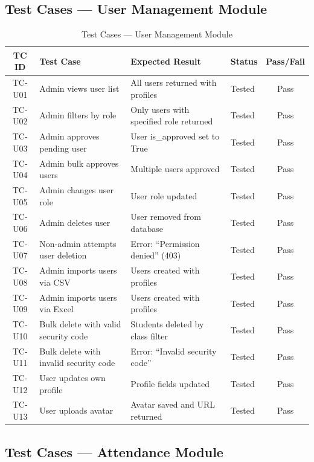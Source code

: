 \subsection{Test Cases --- User Management Module}

\begin{table}[H]
\centering
\caption{Test Cases --- User Management Module}
\label{tab:test_users}
\footnotesize
\begin{tabular}{|c|p{4cm}|p{4cm}|p{2cm}|c|}
\hline
\textbf{TC ID} & \textbf{Test Case} & \textbf{Expected Result} & \textbf{Status} & \textbf{Pass/Fail} \\
\hline
TC-U01 & Admin views user list & All users returned with profiles & Tested & Pass \\
\hline
TC-U02 & Admin filters by role & Only users with specified role returned & Tested & Pass \\
\hline
TC-U03 & Admin approves pending user & User is\_approved set to True & Tested & Pass \\
\hline
TC-U04 & Admin bulk approves users & Multiple users approved & Tested & Pass \\
\hline
TC-U05 & Admin changes user role & User role updated & Tested & Pass \\
\hline
TC-U06 & Admin deletes user & User removed from database & Tested & Pass \\
\hline
TC-U07 & Non-admin attempts user deletion & Error: ``Permission denied'' (403) & Tested & Pass \\
\hline
TC-U08 & Admin imports users via CSV & Users created with profiles & Tested & Pass \\
\hline
TC-U09 & Admin imports users via Excel & Users created with profiles & Tested & Pass \\
\hline
TC-U10 & Bulk delete with valid security code & Students deleted by class filter & Tested & Pass \\
\hline
TC-U11 & Bulk delete with invalid security code & Error: ``Invalid security code'' & Tested & Pass \\
\hline
TC-U12 & User updates own profile & Profile fields updated & Tested & Pass \\
\hline
TC-U13 & User uploads avatar & Avatar saved and URL returned & Tested & Pass \\
\hline
\end{tabular}
\end{table}

\subsection{Test Cases --- Attendance Module}

